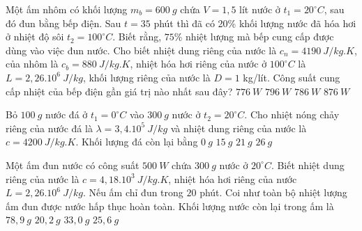 \begin{ex}%
	Một ấm nhôm có khối lượng $m_b = 600\ g$ chứa $V = 1,5$ lít nước ở $t_1 = 20^\circ C$, sau đó đun bằng bếp điện. Sau $t = 35$ phút thì đã có 20\% khối lượng nước đã hóa hơi ở nhiệt độ sôi $t_2 = 100^\circ C$. Biết rằng, $75\%$ nhiệt lượng mà bếp cung cấp được dùng vào việc đun nước. Cho biết nhiệt dung riêng của nước là $c_n = 4190\ J/kg.K$, của nhôm là $c_b = 880\ J/kg.K$, nhiệt hóa hơi riêng của nước ở $100^\circ C$ là $L = 2,26.10^6\ J/kg$, khối lượng riêng của nước là $D = 1$ kg/lít. Công suất cung cấp nhiệt của bếp điện gần giá trị nào nhất sau đây?
	\choice
	{\True $776\ W$}
	{$796\ W$}
	{$786\ W$}
	{$876\ W$}
\end{ex}

\begin{ex}%
	Bỏ $100\ g$ nước đá ở $t_1=0^\circ C$ vào $300\ g$ nước ở $t_2=20^\circ C$. Cho nhiệt nóng chảy riêng của nước đá là $\lambda=3,4.10^5\ J/kg$ và nhiệt dung riêng của nước là $c=4200\ J/kg.K$. Khối lượng đá còn lại	 bằng
	\choice
	{$0\ g$}
	{$15\ g$}
	{$21\ g$}
	{\True $26\ g$}
\end{ex}
\begin{ex}%
	Một ấm đun nước có công suất $500\ W$ chứa $300\ g$ nước ở $20^\circ C$. Biết nhiệt dung riêng của nước là $c = 4,18.10^3\ J/kg.K$, nhiệt hóa hơi riêng của nước $L = 2,26.10^6\ J/kg$. Nếu ấm chỉ đun trong $20$ phút. Coi như toàn bộ nhiệt lượng ấm đun được nước hấp thục hoàn toàn. Khối lượng nước còn lại trong ấm là
	\choice
	{$78,9\ g$}
	{$20,2\ g$}
	{$33,0\ g$}
	{$25,6\ g$}
\end{ex}
